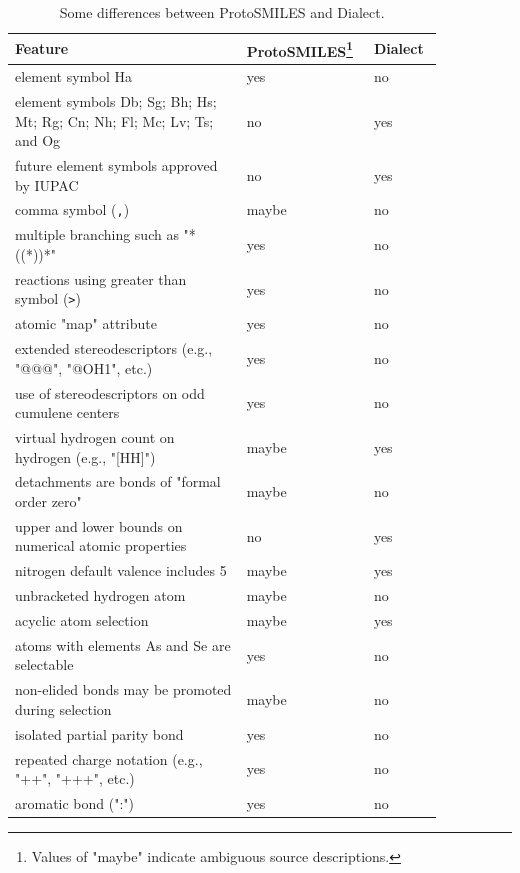 \documentclass{article}
\def\ttt{\texttt}
\begin{document}
\begin{table}
\begin{minipage}{\textwidth}
\renewcommand*\footnoterule{}
    \caption{Some differences between ProtoSMILES and Dialect.}
    \centering
    \begin{tabular}{p{0.50\linewidth} p{0.20\linewidth} p{0.15\linewidth}}
        \hline
        Feature & ProtoSMILES\footnote{Values of "maybe" indicate ambiguous source descriptions.} & Dialect \\
        \hline
        element symbol Ha & yes & no \\
        element symbols Db; Sg; Bh; Hs; Mt; Rg; Cn; Nh; Fl; Mc; Lv; Ts; and Og & no & yes \\
        future element symbols approved by IUPAC & no & yes \\
        comma symbol (\ttt{,}) & maybe & no \\
        multiple branching such as "*((*))*" & yes & no \\
        reactions using greater than symbol (\ttt{>}) & yes & no \\
        atomic "map" attribute & yes & no \\
        extended stereodescriptors (e.g., "@@@", "@OH1", etc.) & yes & no \\
        use of stereodescriptors on odd cumulene centers & yes & no \\
        virtual hydrogen count on hydrogen (e.g., "[HH]") & maybe & yes \\
        detachments are bonds of "formal order zero" & maybe & no \\
        upper and lower bounds on numerical atomic properties & no & yes \\
        nitrogen default valence includes 5 & maybe & yes \\
        unbracketed hydrogen atom & maybe & no \\
        acyclic atom selection & maybe & yes \\
        atoms with elements As and Se are selectable & yes & no \\
        non-elided bonds may be promoted during selection & maybe & no \\
        isolated partial parity bond & yes & no \\
        repeated charge notation (e.g., "++", "+++", etc.) & yes & no \\
        aromatic bond (":") & yes & no \\
        \hline
    \end{tabular}
    \label{table:feature-comparison}
\end{minipage}
\end{table}
\end{document}
